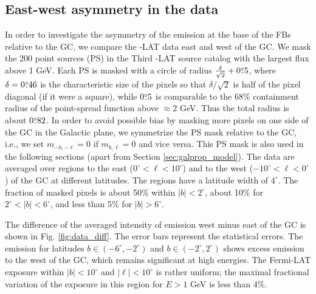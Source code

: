 \subsection{East-west  asymmetry in the data}
\label{sec:data_diff}

In order to investigate the asymmetry of the emission at the base of the FBs relative to the GC, 
we compare the \Fermi-LAT data east and west of the GC. 
We mask the 200 point sources (PS) in the Third \Fermi-LAT source catalog \citep[3FGL,][]{2015ApJS..218...23A}
with the largest flux above 1 GeV.
Each PS is masked with a circle of radius $\frac{\delta}{\sqrt{2}} + 0{\overset{\circ}{.}}5$, where $\delta = 0{\overset{\circ}{.}}46$ is the characteristic size of the pixels
so that ${\delta}/{\sqrt{2}}$ is half of the pixel diagonal (if it were a square), while $0{\overset{\circ}{.}}5$ is comparable to 
the 68\% containment radius of the point-spread function above $\approx 2$ GeV.
Thus the total radius is about $0{\overset{\circ}{.}}82$.
In order to avoid possible bias by masking more pixels on one side of the GC in the Galactic plane,
we symmetrize the PS mask relative to the GC, i.e., we set $m_{-b, -\ell} = 0$ if $m_{b, \ell} = 0$ and vice versa.
This PS mask is also used in the following sections (apart from Section \ref{sec:galprop_model}).
The data are averaged over regions to the east ($0^\circ < \ell < 10^\circ$) and to the west ($-10^\circ < \ell  <  0^\circ$) 
of the GC at different latitudes. 
The regions have a latitude width of $4^\circ$. 
The fraction of masked pixels is about 50\% within $|b| < 2^\circ$, about 10\% for $2^\circ < |b| < 6^\circ$, and less than  5\% 
for $|b| > 6^\circ$.

The difference of the averaged intensity of emission west minus east of the GC is shown in Fig. \ref{fig:data_diff}. 
The error bars represent the statistical errors.
The emission for latitudes $b \in (-6^\circ, -2^\circ)$ and $b \in (-2^\circ, 2^\circ)$ shows excess emission to the west of the GC, 
which remains significant at high energies. 
The Fermi-LAT exposure within $|b| < 10^\circ$ and $|\ell| < 10^\circ$ is rather uniform; 
the maximal fractional variation of the exposure in this region for $E > 1$ GeV is less than 4\%.

